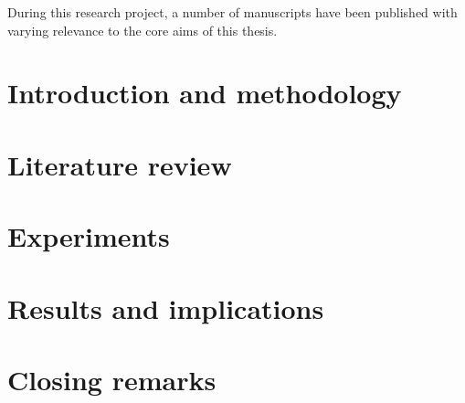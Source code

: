 \documentclass[english]{his-thesis}
\begin{document}

\maketitle

\cleardoublepage
{}%
\setcounter{page}{1}%
\pagestyle{headings}


%
%

\begin{ownpublications}
    During this research project, a number of manuscripts have been published with varying relevance to the core aims of this thesis.
\end{ownpublications}

%

\tableofcontents
\listoffigures
\listoftables

\cleardoublepage
{}%
\setcounter{page}{1}%
\pagestyle{headings}

\part{Introduction and methodology}


\part{Literature review}

\part{Experiments}


\part{Results and implications}




\part{Closing remarks}


%


\listofreferences

\dissertationlist
\end{document}
